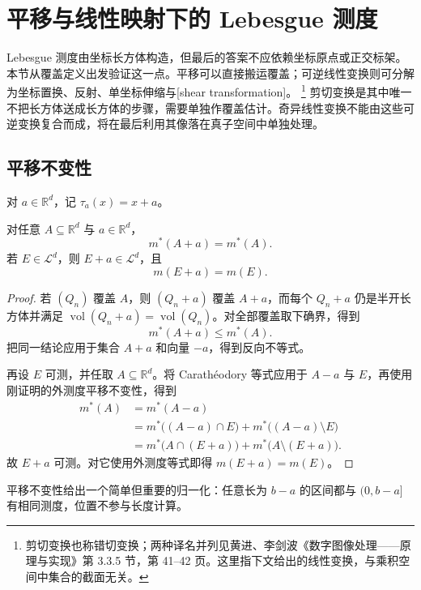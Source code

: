 \section{平移与线性映射下的 Lebesgue 测度}
\label{b1:sec:0304}

Lebesgue 测度由坐标长方体构造，但最后的答案不应依赖坐标原点或正交标架。本节从覆盖定义出发验证这一点。平移可以直接搬运覆盖；可逆线性变换则可分解为坐标置换、反射、单坐标伸缩与[shear transformation]。%
\footnote{剪切变换也称错切变换；两种译名并列见黄进、李剑波《数字图像处理——原理与实现》\cite{Huang2020ShuziTuxiang}第 3.3.5 节，第 41--42 页。这里指下文给出的线性变换，与乘积空间中集合的截面无关。}%
剪切变换是其中唯一不把长方体送成长方体的步骤，需要单独作覆盖估计。奇异线性变换不能由这些可逆变换复合而成，将在最后利用其像落在真子空间中单独处理。

\subsection{平移不变性}
\label{b1:subsec:030401}

对 \(a\in\mathbb R^d\)，记 \(\tau_a(x)=x+a\)。

\begin{theorem}
\label{b1:thm:translation-invariance}
对任意 \(A\subseteq\mathbb R^d\) 与 \(a\in\mathbb R^d\)，
\[
m^*(A+a)=m^*(A).
\]
若 \(E\in\mathcal L^d\)，则 \(E+a\in\mathcal L^d\)，且
\[
m(E+a)=m(E).
\]
\end{theorem}
\begin{proof}
若 \((Q_n)\) 覆盖 \(A\)，则 \((Q_n+a)\) 覆盖 \(A+a\)，而每个 \(Q_n+a\) 仍是半开长方体并满足
\(\operatorname{vol}(Q_n+a)=\operatorname{vol}(Q_n)\)。对全部覆盖取下确界，得到
\[
m^*(A+a)\leq m^*(A).
\]
把同一结论应用于集合 \(A+a\) 和向量 \(-a\)，得到反向不等式。

再设 \(E\) 可测，并任取 \(A\subseteq\mathbb R^d\)。将 Carathéodory 等式应用于 \(A-a\) 与 \(E\)，再使用刚证明的外测度平移不变性，得到
\begin{align*}
m^*(A)
&=m^*(A-a)\\
&=m^*\bigl((A-a)\cap E\bigr)+m^*\bigl((A-a)\setminus E\bigr)\\
&=m^*\bigl(A\cap(E+a)\bigr)+m^*\bigl(A\setminus(E+a)\bigr).
\end{align*}
故 \(E+a\) 可测。对它使用外测度等式即得 \(m(E+a)=m(E)\)。
\end{proof}

平移不变性给出一个简单但重要的归一化：任意长为 \(b-a\) 的区间都与 \((0,b-a]\) 有相同测度，位置不参与长度计算。

